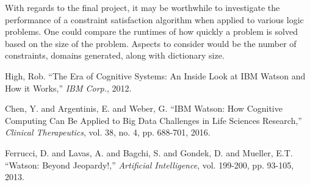 With regards to the final project, it may be worthwhile to investigate the performance of a constraint satisfaction algorithm when applied to various logic problems. One could compare the runtimes of how quickly a problem is solved based on the size of the problem. Aspects to consider would be the number of constraints, domains generated, along with dictionary size.

\begin{thebibliography}{1}

 High, Rob. ``The Era of Cognitive Systems: An Inside Look at IBM Watson and How it Works,'' {\em IBM Corp.}, 2012.

 Chen, Y. and Argentinis, E. and Weber, G. ``IBM Watson: How Cognitive Computing Can Be Applied to Big Data Challenges in Life Sciences Research,'' {\em Clinical Therapeutics}, vol. 38, no. 4, pp. 688-701, 2016.

 Ferrucci, D. and Lavas, A. and Bagchi, S. and Gondek, D. and Mueller, E.T. ``Watson: Beyond Jeopardy!,'' {\em Artificial Intelligence}, vol. 199-200,  pp. 93-105, 2013.

\end{thebibliography}
\pagebreak